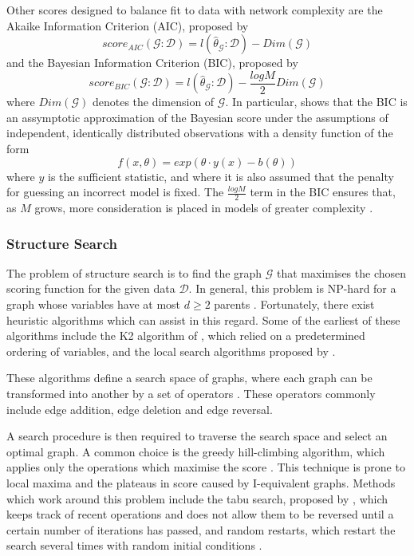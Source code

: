 \documentclass [11pt]{article}
\begin{document}
Other scores designed to balance fit to data with network complexity are the Akaike Information Criterion (AIC), proposed by \citet{akaike98}
\begin{equation*}
score_{AIC}(\mathcal{G}:\mathcal{D}) = l(\hat{\theta}_{\mathcal{G}}:\mathcal{D}) - Dim(\mathcal{G})
\end{equation*}
and the Bayesian Information Criterion (BIC), proposed by \citet{schwarz78}
\begin{equation*}
score_{BIC}(\mathcal{G}:\mathcal{D}) = l(\hat{\theta}_{\mathcal{G}}:\mathcal{D}) - \frac{logM}{2}Dim(\mathcal{G})
\end{equation*}
where $Dim(\mathcal{G})$ denotes the dimension of $\mathcal{G}$. In particular, \citet{schwarz78} shows that the BIC is an assymptotic approximation of the Bayesian score under the assumptions of independent, identically distributed observations with a density function of the form
\begin{equation*}
f(x,\theta) = exp(\theta \cdot y(x) - b(\theta))
\end{equation*}
where $y$ is the sufficient statistic, and where it is also assumed that the penalty for guessing an incorrect model is fixed. The $\frac{logM}{2}$ term in the BIC ensures that, as $M$ grows, more consideration is placed in models of greater complexity \citep{koller09}.
\subsubsection{Structure Search}\label{StructureSearch}
The problem of structure search is to find the graph $\mathcal{G}$ that maximises the chosen scoring function for the given data $\mathcal{D}$. In general, this problem is NP-hard for a graph whose variables have at most $d\geq 2$ parents \citep{chickering96}. Fortunately, there exist heuristic algorithms which can assist in this regard. Some of the earliest of these algorithms include the K2 algorithm of \citet{cooper92}, which relied on a predetermined ordering of variables, and the local search algorithms proposed by \citet{heckerman95}.

These algorithms define a search space of graphs, where each graph can be transformed into another by a set of operators \citep{koller09}. These operators commonly include edge addition, edge deletion and edge reversal. 

A search procedure is then required to traverse the search space and select an optimal graph. A common choice is the greedy hill-climbing algorithm, which applies only the operations which maximise the score \citep{koller09}. This technique is prone to local maxima and the plateaus in score caused by I-equivalent graphs. Methods which work around this problem include the tabu search, proposed by \citet{glover86}, which keeps track of recent operations and does not allow them to be reversed until a certain number of iterations has passed, and random restarts, which restart the search several times with random initial conditions \citep{koller09}.
\end{document}
